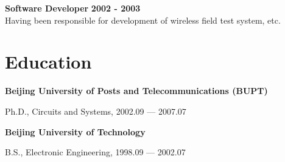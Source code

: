 \documentclass[a4paper,margin,line]{res}
\newenvironment{list1}{
  \begin{list}{\ding{113}}{%
      \setlength{\itemsep}{0in}
      \setlength{\parsep}{0in} \setlength{\parskip}{0in}
      \setlength{\topsep}{0in} \setlength{\partopsep}{0in} 
      \setlength{\leftmargin}{0.17in}}}{\end{list}}
\begin{document}
\begin{resume}
{\bf Software Developer} \hfill {\bf 2002 - 2003}\\
Having been responsible for development of wireless field test system, etc.

\section{\sc Education}
{\bf Beijing University of Posts and Telecommunications (BUPT)}\\
\vspace*{-.1in}
\begin{list1}
\item[] Ph.D., Circuits and Systems, 2002.09 --- 2007.07
\end{list1}

{\bf Beijing University of Technology}\\
\vspace*{-.1in}
\begin{list1}
\item[] B.S., Electronic Engineering, 1998.09 --- 2002.07
\end{list1}


\end{resume}
\end{document}
